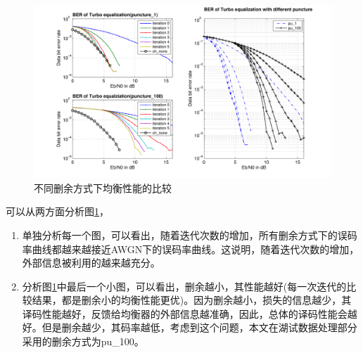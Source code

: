 \begin{figure}[htb]
  \begin{center}
    \includegraphics[width=\textwidth]{images/different_punture_separate.pdf}
  \end{center}
  \caption{不同删余方式下均衡性能的比较}
  \label{fig:3.6}
\end{figure}
可以从两方面分析图\ref{fig:3.6}，
\begin{enumerate}
    \item
        单独分析每一个图，可以看出，随着迭代次数的增加，所有删余方式下的误码率曲线都越来越接近AWGN下的误码率曲线。这说明，随着迭代次数的增加，外部信息被利用的越来越充分。
    \item
        分析图\ref{fig:3.6}中最后一个小图，可以看出，删余越小，其性能越好(每一次迭代的比较结果，都是删余小的均衡性能更优)。因为删余越小，损失的信息越少，其译码性能越好，反馈给均衡器的外部信息越准确，因此，总体的译码性能会越好。但是删余越少，其码率越低，考虑到这个问题，本文在湖试数据处理部分采用的删余方式为pu\_100。
\end{enumerate}

